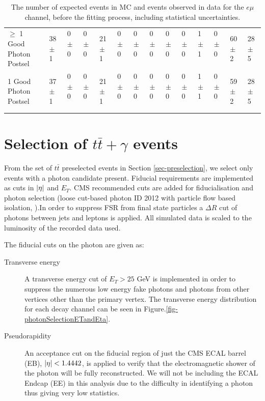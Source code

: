 \begin{table}
{\begin{tabular}{|l|l|l|l|l|l|l|l|l|l|l|l|l|l|}
$\geq$ 1 Good Photon Postsel & 38 $\pm$ 1 \ & 0 $\pm$ 0 \ & 0 $\pm$ 0 \ & 21 $\pm$ 1 \ & 0 $\pm$ 0 \ & 0 $\pm$ 0 \ & 0 $\pm$ 0 \ & 0 $\pm$ 0 \ & 0 $\pm$ 0 \ & 1 $\pm$ 1 \ & 0 $\pm$ 0 \ & 60 $\pm$ 2\ & 28 $\pm$ 5 \\
1 Good Photon Postsel & 37 $\pm$ 1 \ & 0 $\pm$ 0 \ & 0 $\pm$ 0 \ & 21 $\pm$ 1 \ & 0 $\pm$ 0 \ & 0 $\pm$ 0 \ & 0 $\pm$ 0 \ & 0 $\pm$ 0 \ & 0 $\pm$ 0 \ & 1 $\pm$ 1 \ & 0 $\pm$ 0 \ & 59 $\pm$ 2\ & 28 $\pm$ 5 \\
\hline
\end{tabular}
}
\caption{The number of expected events in MC and events observed in data for the $e\mu$ channel, before the fitting process, including statistical uncertainties.}
\end{table}


\section{Selection of $t\bar{t}+\gamma$ events} \label{sec-postselection}

From the set of $t\bar{t}$ preselected events in Section \ref{sec-preselection}, we select only events with a photon candidate present.  Fiducial requirements are implemented as cuts in $\lvert \eta \rvert$ and $E_T$. CMS recommended cuts are added for fiducialisation and photon selection (loose cut-based photon ID 2012 with particle flow based isolation, \cite{CutBasedIsolation2012}).In order to suppress FSR from final state particles a $\Delta R$ cut of photons between jets and leptons is applied. All simulated data is scaled to the luminosity of the recorded data used.  

The fiducial cuts on the photon are given as:

\begin{description}

\item[Transverse energy] A transverse energy cut of $E_T > 25$ GeV is implemented in order to suppress the numerous low energy fake photons and photons from other vertices other than the primary
vertex. The transverse energy distribution for each decay channel can be seen in Figure.\ref{fig-photonSelectionETandEta}.

\item[Pseudorapidity] An acceptance cut on the fiducial region of just the CMS ECAL barrel (EB), $\lvert \eta \rvert < 1.4442$, is applied to verify that the electromagnetic shower of the photon will be fully reconstructed. We will not be including the ECAL Endcap (EE) in this analysis due to the difficulty in identifying a photon thus giving very low statistics.

\end{description}

